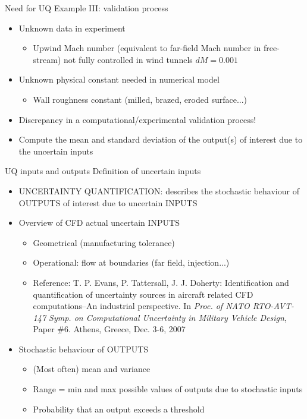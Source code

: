\documentclass[10pt]{beamer}
\def\vo{\vspace{1mm}}
\def\vr{\vspace{3mm}}
\def\begit{\begin{itemize}}
\def\endit{\end{itemize}}
\newcommand{\Mach}{M}
\begin{document}
\begin{frame}{Need for UQ} {Example III: validation process}
%
\begit
\item Unknown data in experiment
     \begit
     \item Upwind Mach number (equivalent to far-field Mach number in free-stream) not fully controlled in wind tunnels $d\Mach=0.001$     
     \endit
\vo
\item Unknown physical constant needed in numerical model
     \begit
     \item Wall roughness constant (milled, brazed, eroded surface...)
     \endit
\vo
\item Discrepancy in a computational/experimental validation process!
%
\vo
\item Compute the mean and standard deviation of the output(s) of interest due to the uncertain inputs
\endit
%
\end{frame} 
%
%
\begin{frame}{UQ inputs and outputs} {Definition of uncertain inputs}
%
\begit
\item UNCERTAINTY QUANTIFICATION: describes the stochastic behaviour of OUTPUTS of interest due to uncertain INPUTS
\vr
\item Overview of CFD actual uncertain INPUTS
  \begit
  \item Geometrical (manufacturing tolerance)
  \item Operational: flow at boundaries (far field, injection...)
  \item Reference: \scriptsize{T. P. Evans, P. Tattersall, J. J. Doherty: Identification and quantification of uncertainty sources in aircraft related CFD computations--An industrial perspective. In {\sl Proc. of NATO RTO-AVT-147 Symp. on Computational Uncertainty in Military Vehicle Design}, Paper \#6. Athens, Greece, Dec. 3-6, 2007}
  \endit  
\vr
\item Stochastic behaviour of OUTPUTS
  \begit
  \item (Most often) mean and variance  
  \item Range = min and max possible values of outputs due to stochastic inputs
  \item Probability that an output exceeds a threshold
  \endit  
\endit
%
\end{frame} 
\end{document}
